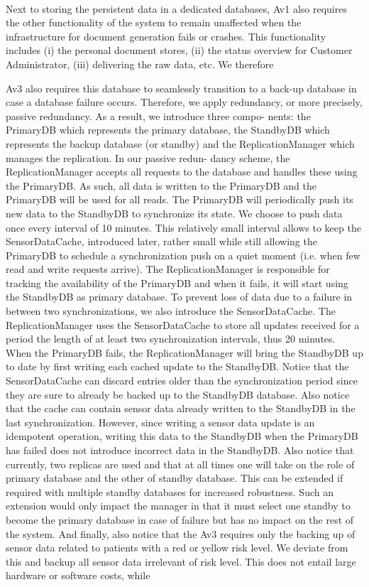 \documentclass[a4paper,10pt]{article}
\begin{document}
\paragraph{}
Next to storing the  persistent data in a dedicated databases, Av1 also requires the other functionality of the system to remain unaffected when the infrastructure for document generation fails or crashes. This functionality includes (i) the personal document stores, (ii) the status overview for Customer Administrator, (iii) delivering the raw data, etc.
We therefore 


 Av3 also requires this database to seamlessly transition to a back-up database in case a database failure occurs. Therefore, we apply redundancy, or more precisely, passive redundancy. As a result, we introduce three compo- nents: the PrimaryDB which represents the primary database, the StandbyDB which represents the backup database (or standby) and the ReplicationManager which manages the replication. In our passive redun- dancy scheme, the ReplicationManager accepts all requests to the database and handles these using the PrimaryDB. As such, all data is written to the PrimaryDB and the PrimaryDB will be used for all reads. The PrimaryDB will periodically push its new data to the StandbyDB to synchronize its state. We choose to push data once every interval of 10 minutes. This relatively small interval allows to keep the SensorDataCache, introduced later, rather small while still allowing the PrimaryDB to schedule a synchronization push on a quiet moment (i.e. when few read and write requests arrive). The ReplicationManager is responsible for tracking the availability of the PrimaryDB and when it fails, it will start using the StandbyDB as primary database. To prevent loss of data due to a failure in between two synchronizations, we also introduce the SensorDataCache. The ReplicationManager uses the SensorDataCache to store all updates received for a period the length of at least two synchronization intervals, thus 20 minutes. When the PrimaryDB fails, the ReplicationManager will bring the StandbyDB up to date by first writing each cached update to the StandbyDB. Notice that the SensorDataCache can discard entries older than the synchronization period since they are sure to already be backed up to the StandbyDB database. Also notice that the cache can contain sensor data already written to the StandbyDB in the last synchronization. However, since writing a sensor data update is an idempotent operation, writing this data to the StandbyDB when the PrimaryDB has failed does not introduce incorrect data in the StandbyDB. Also notice that currently, two replicas are used and that at all times one will take on the role of primary database and the other of standby database. This can be extended if required with multiple standby databases for increased robustness. Such an extension would only impact the manager in that it must select one standby to become the primary database in case of failure but has no impact on the rest of the system. And finally, also notice that the Av3 requires only the backing up of sensor data related to patients with a red or yellow risk level. We deviate from this and backup all sensor data irrelevant of risk level. This does not entail large hardware or software costs, while 
\end{document}
